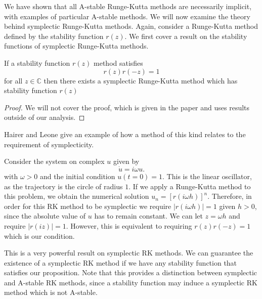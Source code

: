 
We have shown that all A-stable Runge-Kutta methods are necessarily implicit, with examples of particular A-stable methods.
We will now examine the theory behind symplectic Runge-Kutta methods.
Again, consider a Runge-Kutta method defined by the stability function $r(z)$.
We first cover a result on the stability functions of symplectic Runge-Kutta methods.
\begin{proposition} \label{prp:rksymp}
	If a stability function $r(z)$ method satisfies
	\begin{equation*}
		r(z)r(-z) = 1
	\end{equation*}
	for all $z \in \mathds{C}$ then there exists a symplectic Runge-Kutta method which has stability function $r(z)$ 
\end{proposition}
\begin{proof}
	We will not cover the proof, which is given in the paper \cite{hairer2000properties} and uses results outside of our analysis.
\end{proof}
Hairer and Leone give an example of how a method of this kind relates to the requirement of symplecticity.
\begin{example}
	Consider the system on complex $u$ given by
	\begin{equation*}
		\dot{u} = i \omega u.
	\end{equation*}
	with $\omega > 0$ and the initial condition $u(t=0) = 1$.
	This is the linear oscillator, as the trajectory is the circle of radius $1$.
	If we apply a Runge-Kutta method to this problem, we obtain the numerical solution $u_n = [r(i \omega h)]^n$.
	Therefore, in order for this RK method to be symplectic we require $|r(i \omega h)| = 1$ given $h > 0$,
	since the absolute value of $u$ has to remain constant.
	We can let $z = \omega h$ and require $|r(iz)| = 1$.
	However, this is equivalent to requiring $r(z)r(-z)=1$ which is our condition.
\end{example}
This is a very powerful result on symplectic RK methods.
We can guarantee the existence of a symplectic RK method if we have any stability function that satisfies our proposition.
Note that this provides a distinction between symplectic and A-stable RK methods, since a stability function may induce a symplectic RK method which is not A-stable.

